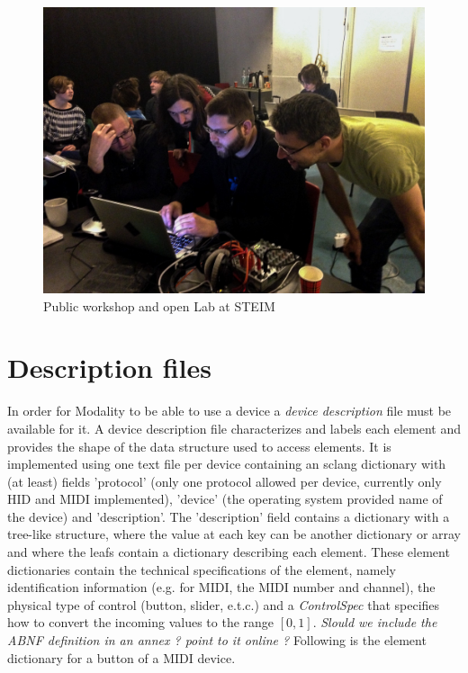\documentclass{article}
\begin{document}
\begin{figure}[h]
	\centering
		\includegraphics[width=.9\columnwidth]{../media/20140403-IMG_1667.jpg}
	\caption{Public workshop and open Lab at STEIM}
	\label{fig:media_20140331-IMG_5976}
\end{figure}


\section{Description files}
\label{sec:descriptions_files}

In order for Modality to be able to use a device a \textit{device description} file must be available for it.  A device description file characterizes and labels each element and provides the shape of the data structure used to access elements. It is implemented using one text file per device containing an sclang dictionary with (at least) fields 'protocol' (only one protocol allowed per device, currently only HID and MIDI implemented), 'device' (the operating system provided name of the device) and 'description'. The 'description' field contains a dictionary with a tree-like structure, where the value at each key can be another dictionary or array and where the leafs contain a dictionary describing each element. These element dictionaries contain the technical specifications of the element, namely identification information (e.g. for MIDI, the MIDI number and channel), the physical type of control (button, slider, e.t.c.) and a \textit{ControlSpec} that specifies how to convert the incoming values to the range $[0,1]$.   \emph{Slould we include the ABNF definition  in an annex ? point to it online ?} Following is the element dictionary for a button of a MIDI device.
\end{document}
